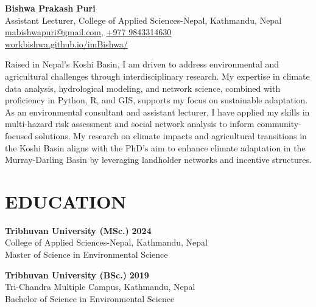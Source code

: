 \documentclass[a4paper, 09pt]{extarticle}
\begin{document}
\begin{center}
\textbf{\huge Bishwa Prakash Puri}\\[4pt] 
Assistant Lecturer, College of Applied Sciences-Nepal, Kathmandu, Nepal\\
\href{mailto:mabishwapuri@gmail.com}{mabishwapuri@gmail.com}, 
\href{tel:+9779843314630}{+977 9843314630} \\
\href{https://workbishwa.github.io/imBishwa/}{workbishwa.github.io/imBishwa/}

\end{center}

Raised in Nepal’s Koshi Basin, I am driven to address environmental and agricultural challenges through interdisciplinary research. My expertise in climate data analysis, hydrological modeling, and network science, combined with proficiency in Python, R, and GIS, supports my focus on sustainable adaptation. As an environmental consultant and assistant lecturer, I have applied my skills in multi-hazard risk assessment and social network analysis to inform community-focused solutions. My research on climate impacts and agricultural transitions in the Koshi Basin aligns with the PhD’s aim to enhance climate adaptation in the Murray-Darling Basin by leveraging landholder networks and incentive structures.

\section*{EDUCATION}

\textbf{Tribhuvan University (MSc.)} \hfill \textbf{2024}\\[2pt] 
College of Applied Sciences-Nepal, Kathmandu, Nepal\\
Master of Science in Environmental Science

\vspace{5pt}

\noindent
\textbf{Tribhuvan University (BSc.)} \hfill \textbf{2019}\\[2pt] 
Tri-Chandra Multiple Campus, Kathmandu, Nepal\\
Bachelor of Science in Environmental Science

\vspace{5pt}
\end{document}

